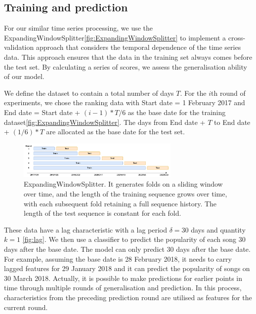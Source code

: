 \documentclass{article}
\begin{document}
\subsection{Training and prediction}
For our similar time series processing, we use the ExpandingWindowSplitter\autoref{fig:ExpandingWindowSplitter} to implement a cross-validation approach that considers the temporal dependence of the time series data. This approach ensures that the data in the training set always comes before the test set. By calculating a series of scores, we assess the generalisation ability of our model.

We define the dataset to contain a total number of days $T$. For the $i$th round of experiments, we chose the ranking data with Start date = 1 February 2017 and End date = Start date + $(i-1)*T/6$ as the base date for the training dataset\autoref{fig:ExpandingWindowSplitter}. The days from End date + $T$ to End date + $(1/6)*T$ are allocated as the base date for the test set.

\begin{figure}[h] %
  \centering
  \includegraphics[width=0.7\textwidth]{kfold.drawio.png}
  \captionsetup{labelformat=default}
  \caption{ExpandingWindowSplitter. It generates folds on a sliding window over time, and the length of the training sequence grows over time, with each subsequent fold retaining a full sequence history. The length of the test sequence is constant for each fold.}
  \label{fig:ExpandingWindowSplitter}
\end{figure}

These data have a lag characteristic with a lag period $\delta = 30$ days and quantity $k = 1$ \autoref{fig:lag}. We then use a classifier to predict the popularity of each song 30 days after the base date. The model can only predict 30 days after the base date. For example, assuming the base date is 28 February 2018, it needs to carry lagged features for 29 January 2018 and it can predict the popularity of songs on 30 March 2018. Actually, it is possible to make predictions for earlier points in time through multiple rounds of generalisation and prediction. In this process, characteristics from the preceding prediction round are utilised as features for the current round.
\end{document}
